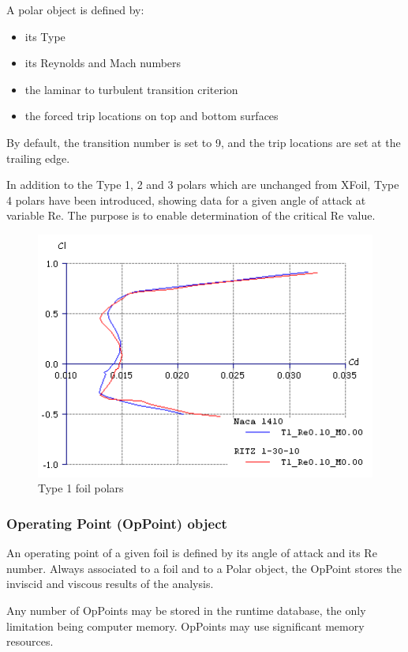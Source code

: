 \documentclass[a4paper,twoside,12pt,dvips]{article}
\begin{document}
A polar object is defined by:

\begin{itemize}
\item its Type
\item its Reynolds and Mach numbers
\item the laminar to turbulent transition criterion
\item the forced trip locations on top and bottom surfaces
\end{itemize}

By default, the transition number is set to 9, and the trip locations
are set at the trailing edge.

In addition to the Type 1, 2 and 3 polars which are unchanged from
XFoil, Type 4 polars have been introduced, showing data for a given
angle of attack at variable Re. The purpose is to enable determination
of the critical Re value.

\begin{figure}[htbp]
  \includegraphics[width=0.8\linewidth]{img-02}\centering 
  \caption{Type 1 foil polars}
  \label{fig:type_1_foil_polars}
\end{figure}

\subsubsection{Operating Point (OpPoint) object}

An operating point of a given foil is defined by its angle of attack
and its Re number. Always associated to a foil and to a Polar object,
the OpPoint stores the inviscid and viscous results of the analysis.

Any number of OpPoints may be stored in the runtime database, the only
limitation being computer memory. OpPoints may use significant memory
resources.
\end{document}
